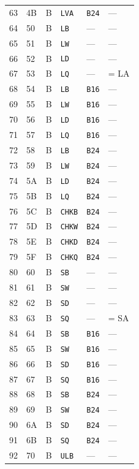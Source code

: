 \documentclass[10pt,a4paper,twoside,openany]{book}
\begin{document}
\begin{landscape}
\begin{longtable}{@{}r l c l l p{10.7cm}@{}}
63 & 4B & B & \texttt{LVA} & \texttt{B24} & ---\\
64 & 50 & B & \texttt{LB} & --- & ---\\
65 & 51 & B & \texttt{LW} & --- & ---\\
66 & 52 & B & \texttt{LD} & --- & ---\\
67 & 53 & B & \texttt{LQ} & --- & = LA\\
68 & 54 & B & \texttt{LB} & \texttt{B16} & ---\\
69 & 55 & B & \texttt{LW} & \texttt{B16} & ---\\
70 & 56 & B & \texttt{LD} & \texttt{B16} & ---\\
71 & 57 & B & \texttt{LQ} & \texttt{B16} & ---\\
72 & 58 & B & \texttt{LB} & \texttt{B24} & ---\\
73 & 59 & B & \texttt{LW} & \texttt{B24} & ---\\
74 & 5A & B & \texttt{LD} & \texttt{B24} & ---\\
75 & 5B & B & \texttt{LQ} & \texttt{B24} & ---\\
76 & 5C & B & \texttt{CHKB} & \texttt{B24} & ---\\
77 & 5D & B & \texttt{CHKW} & \texttt{B24} & ---\\
78 & 5E & B & \texttt{CHKD} & \texttt{B24} & ---\\
79 & 5F & B & \texttt{CHKQ} & \texttt{B24} & ---\\
80 & 60 & B & \texttt{SB} & --- & ---\\
81 & 61 & B & \texttt{SW} & --- & ---\\
82 & 62 & B & \texttt{SD} & --- & ---\\
83 & 63 & B & \texttt{SQ} & --- & = SA\\
84 & 64 & B & \texttt{SB} & \texttt{B16} & ---\\
85 & 65 & B & \texttt{SW} & \texttt{B16} & ---\\
86 & 66 & B & \texttt{SD} & \texttt{B16} & ---\\
87 & 67 & B & \texttt{SQ} & \texttt{B16} & ---\\
88 & 68 & B & \texttt{SB} & \texttt{B24} & ---\\
89 & 69 & B & \texttt{SW} & \texttt{B24} & ---\\
90 & 6A & B & \texttt{SD} & \texttt{B24} & ---\\
91 & 6B & B & \texttt{SQ} & \texttt{B24} & ---\\
92 & 70 & B & \texttt{ULB} & --- & ---\\

\end{longtable}
\end{landscape}
\end{document}

